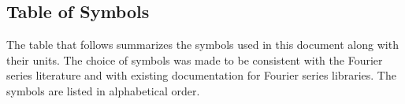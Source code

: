 \documentclass[12pt]{article}
\begin{document}
%
%

\subsection{Table of Symbols}

The table that follows summarizes the symbols used in this document along with
their units.  The choice of symbols was made to be consistent with the Fourier series literature and with existing documentation for Fourier series libraries. The symbols are listed in alphabetical order.
\end{document}
